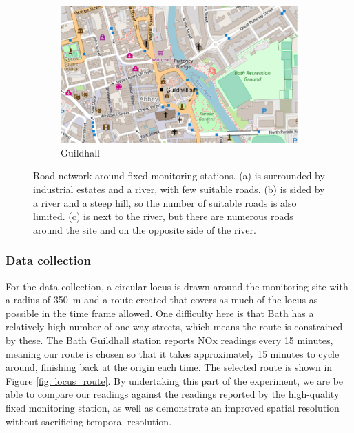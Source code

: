 \documentclass[11pt]{report}
\begin{document}
\begin{figure}[!tb]
\begin{minipage}{.9\linewidth}
\begin{subfigure}[t]{.5\linewidth}
            \includegraphics[width=\textwidth]{images/guildhall}
            \caption{Guildhall}
            \label{fig: guildhall}
        \end{subfigure}
    \end{minipage}
    \caption{Road network around fixed monitoring stations. (a) is surrounded by industrial estates and a river, with few suitable roads. (b) is sided by a river and a steep hill, so the number of suitable roads is also limited. (c) is next to the river, but there are numerous roads around the site and on the opposite side of the river.}
\end{figure}


\subsubsection{Data collection}

For the data collection, a circular locus is drawn around the monitoring site with a radius of 350~m and a route created that covers as much of the locus as possible in the time frame allowed. One difficulty here is that Bath has a relatively high number of one-way streets, which means the route is constrained by these. The Bath Guildhall station reports NOx readings every 15 minutes, meaning our route is chosen so that it takes approximately 15 minutes to cycle around, finishing back at the origin each time. The selected route is shown in Figure \ref{fig: locus_route}. By undertaking this part of the experiment, we are be able to compare our readings against the readings reported by the high-quality fixed monitoring station, as well as demonstrate an improved spatial resolution without sacrificing temporal resolution.
\end{document}
